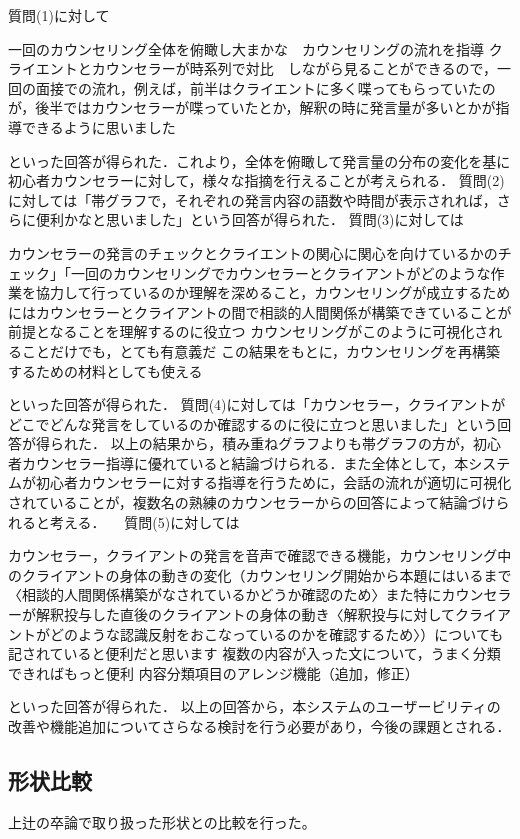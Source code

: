 \documentclass[shuuron]{kuee}
\begin{document}
質問(1)に対して

  一回のカウンセリング全体を俯瞰し大まかな　カウンセリングの流れを指導
  クライエントとカウンセラーが時系列で対比　しながら見ることができるので，一回の面接での流れ，例えば，前半はクライエントに多く喋ってもらっていたのが，後半ではカウンセラーが喋っていたとか，解釈の時に発言量が多いとかが指導できるように思いました

といった回答が得られた．これより，全体を俯瞰して発言量の分布の変化を基に初心者カウンセラーに対して，様々な指摘を行えることが考えられる．
質問(2)に対しては「帯グラフで，それぞれの発言内容の語数や時間が表示されれば，さらに便利かなと思いました」という回答が得られた．
質問(3)に対しては

  カウンセラーの発言のチェックとクライエントの関心に関心を向けているかのチェック」「一回のカウンセリングでカウンセラーとクライアントがどのような作業を協力して行っているのか理解を深めること，カウンセリングが成立するためにはカウンセラーとクライアントの間で相談的人間関係が構築できていることが前提となることを理解するのに役立つ
  カウンセリングがこのように可視化されることだけでも，とても有意義だ
  この結果をもとに，カウンセリングを再構築するための材料としても使える

といった回答が得られた．
質問(4)に対しては「カウンセラー，クライアントが　　どこでどんな発言をしているのか確認するのに役に立つと思いました」という回答が得られた．
以上の結果から，積み重ねグラフよりも帯グラフの方が，初心者カウンセラー指導に優れていると結論づけられる．また全体として，本システムが初心者カウンセラーに対する指導を行うために，会話の流れが適切に可視化されていることが，複数名の熟練のカウンセラーからの回答によって結論づけられると考える．
　質問(5)に対しては

  カウンセラー，クライアントの発言を音声で確認できる機能，カウンセリング中のクライアントの身体の動きの変化（カウンセリング開始から本題にはいるまで〈相談的人間関係構築がなされているかどうか確認のため〉また特にカウンセラーが解釈投与した直後のクライアントの身体の動き〈解釈投与に対してクライアントがどのような認識反射をおこなっているのかを確認するため〉）についても記されていると便利だと思います
  複数の内容が入った文について，うまく分類できればもっと便利
  内容分類項目のアレンジ機能（追加，修正）



といった回答が得られた．
以上の回答から，本システムのユーザービリティの　改善や機能追加についてさらなる検討を行う必要があり，今後の課題とされる．

\subsection{形状比較}
上辻の卒論で取り扱った形状との比較を行った。
\end{document}
